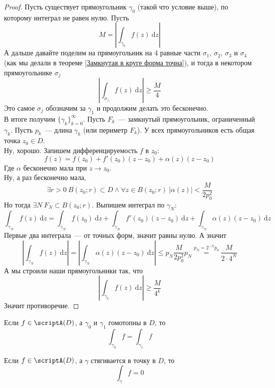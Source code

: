 \documentclass{article}
\begin{document}
    \begin{proof}
        Пусть существует прямоугольник $\gamma_0$ (такой что условие выше), по которому интеграл не равен нулю. Пусть
        $$
        M=\left|\int_{\gamma_0}f(z)~\mathrm dz\right|
        $$
        А дальше давайте поделим на прямоугольник на 4 равные части $\sigma_1$, $\sigma_2$, $\sigma_3$ и $\sigma_4$ (как мы делали в теореме \ref{Замкнутая в круге форма точна}), и тогда в некотором прямоугольнике $\sigma_j$
        $$
        \left|\int_{\sigma_j}f(z)~\mathrm dz\right|\geqslant\frac M4
        $$
        Это самое $\sigma_j$ обозначим за $\gamma_1$ и продолжим делать это бесконечно.\\
        В итоге получим $\{\gamma_k\}_{k=0}^\infty$. Пусть $F_k$~--- замкнутый прямоугольник, ограниченный $\gamma_k$. Пусть $p_k$~--- длина $\gamma_k$ (или периметр $F_k$). У всех прямоугольников есть общая точка $z_0\in D$.\\
        Ну, хорошо. Запишем дифференцируемость $f$ в $z_0$:
        $$
        f(z)=f(z_0)+f'(z_0)(z-z_0)+\alpha(z)(z-z_0)
        $$
        Где $\alpha$ бесконечно мала при $z\to z_0$.\\
        Ну, а раз бесконечно мала,
        $$
        \exists r>0~B(z_0;r)\subset D\land\forall z\in B(z_0;r)~|\alpha(z)|<\frac{M}{2p_0^2}
        $$
        Но тогда $\exists N~F_N\subset B(z_0;r)$. Выпишем интеграл по $\gamma_N$:
        $$
        \int_{\gamma_N}f(z)~\mathrm dz=\int_{\gamma_N}f(z_0)~\mathrm dz+\int_{\gamma_N}f'(z_0)(z-z_0)~\mathrm dz+\int_{\gamma_N}\alpha(z)(z-z_0)~\mathrm dz
        $$
        Первые два интеграла~--- от точных форм, значит равны нулю. А значит
        $$
        \left|\int_{\gamma_N}f(z)~\mathrm dz\right|=\left|\int_{\gamma_N}\alpha(z)(z-z_0)~\mathrm dz\right|\leqslant p_N\frac{M}{2p_0^2}p_N\overset{p_N=2^{-N}p_0}=\frac M{2\cdot 4^N}
        $$
        А мы строили наши прямоугольники так, что
        $$
        \left|\int_{\gamma_k}f(z)~\mathrm dz\right|\geqslant\frac M{4^k}
        $$
        Значит противоречие.
    \end{proof}
    \begin{corollary}
        Если $f\in\scriptA(D)$, а $\gamma_0$ и $\gamma_1$ гомотопны в $D$, то
        $$
        \int_{\gamma_0}f=\int_{\gamma_1}f
        $$
    \end{corollary}
    \begin{corollary}
        Если $f\in\scriptA(D)$, а $\gamma$ стягивается в точку в $D$, то
        $$
        \int_\gamma f=0
        $$
    \end{corollary}
\end{document}
